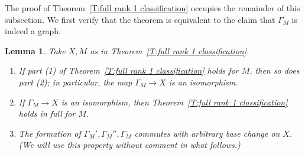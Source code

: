 \documentclass[12pt]{article}
\newtheorem{lemma}[theorem]{Lemma}
\theoremstyle{definition}
\numberwithin{equation}{theorem}
\begin{document}
The proof of Theorem~\ref{T:full rank 1 classification} occupies the remainder of this subsection. We first verify that the theorem is equivalent to the claim that $\Gamma_M$ is indeed a graph.
\begin{lemma} \label{L:graph criterion}
Take $X,M$ as in Theorem~\ref{T:full rank 1 classification}.
\begin{enumerate}
\item[(1)]
If part (1) of Theorem~\ref{T:full rank 1 classification} holds for $M$, then
so does part (2); in particular, the map $\Gamma_M \to X$ is an isomorphism.
\item[(2)]
If $\Gamma_M \to X$ is an isomorphism, then Theorem~\ref{T:full rank 1 classification} holds in full for $M$.
\item[(3)]
The formation of $\Gamma_M', \Gamma_M'', \Gamma_M$ commutes with arbitrary base change on $X$. (We will use this property without comment in what follows.)
\end{enumerate}
\end{lemma}
\end{document}
